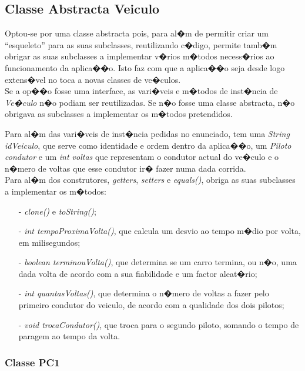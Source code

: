 \documentclass[10pt,notitlepage]{article}
\begin{document}
\subsection{Classe Abstracta Veiculo}

Optou-se por uma classe abstracta pois, para al�m de permitir criar um ``esqueleto'' para as suas subclasses, reutilizando c�digo, permite tamb�m obrigar as suas subclasses a implementar v�rios m�todos necess�rios ao funcionamento da aplica��o. Isto faz com que a aplica��o seja desde logo extens�vel no toca a novas classes de ve�culos. \\

Se a op��o fosse uma interface, as vari�veis e m�todos de inst�ncia de \textit{Ve�culo} n�o podiam ser reutilizadas. Se n�o fosse uma classe abstracta, n�o obrigava as subclasses a implementar os m�todos pretendidos.

Para al�m das vari�veis de inst�ncia pedidas no enunciado, tem uma \textit{String idVeiculo}, que serve como identidade e ordem dentro da aplica��o, um \textit{Piloto condutor} e um \textit{int voltas} que representam o condutor actual do ve�culo e o n�mero de voltas que esse condutor ir� fazer numa dada corrida. \\

Para al�m dos construtores, \textit{getters}, \textit{setters} e \textit{equals()}, obriga as suas subclasses a implementar os m�todos:

\begin{itemize}
\item[-] \textit{clone()} e \textit{toString()};
\item[-] \textit{int tempoProximaVolta()}, que calcula um desvio ao tempo m�dio por volta, em milisegundos;
\item[-] \textit{boolean terminouVolta()}, que determina se um carro termina, ou n�o, uma dada volta de acordo com a sua fiabilidade e um factor aleat�rio;
\item[-] \textit{int quantasVoltas()}, que determina o n�mero de voltas a fazer pelo primeiro condutor do veiculo, de acordo com a qualidade dos dois pilotos;
\item[-] \textit{void trocaCondutor()}, que troca para o segundo piloto, somando o tempo de paragem ao tempo da volta.
\end{itemize}

\subsubsection{Classe PC1}
\end{document}
